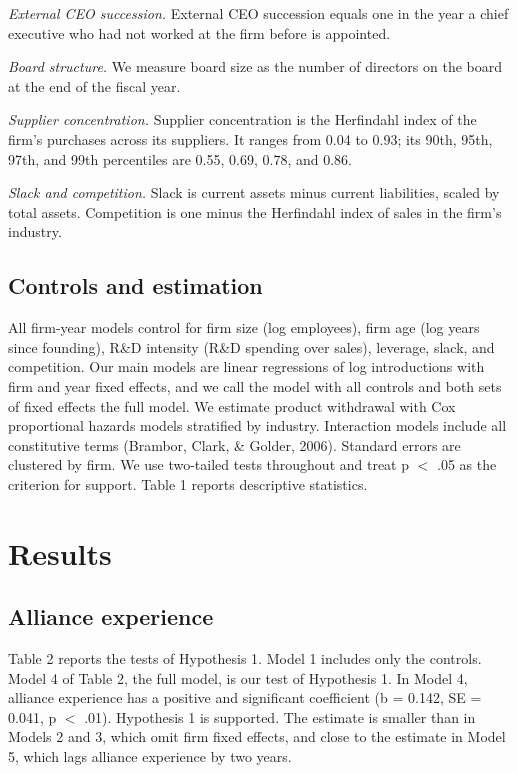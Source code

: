 \documentclass[12pt]{article}
\begin{document}
\textit{External CEO succession.} External CEO succession equals one in the year a chief executive who had not worked at the firm before is appointed.

\textit{Board structure.} We measure board size as the number of directors on the board at the end of the fiscal year.

\textit{Supplier concentration.} Supplier concentration is the Herfindahl index of the firm's purchases across its suppliers. It ranges from 0.04 to 0.93; its 90th, 95th, 97th, and 99th percentiles are 0.55, 0.69, 0.78, and 0.86.

\textit{Slack and competition.} Slack is current assets minus current liabilities, scaled by total assets. Competition is one minus the Herfindahl index of sales in the firm's industry.

\subsection{Controls and estimation}

All firm-year models control for firm size (log employees), firm age (log years since founding), R\&D intensity (R\&D spending over sales), leverage, slack, and competition. Our main models are linear regressions of log introductions with firm and year fixed effects, and we call the model with all controls and both sets of fixed effects the full model. We estimate product withdrawal with Cox proportional hazards models stratified by industry. Interaction models include all constitutive terms (Brambor, Clark, \& Golder, 2006). Standard errors are clustered by firm. We use two-tailed tests throughout and treat p $<$ .05 as the criterion for support. Table 1 reports descriptive statistics.

\section{Results}

\subsection{Alliance experience}

Table 2 reports the tests of Hypothesis 1. Model 1 includes only the controls. Model 4 of Table 2, the full model, is our test of Hypothesis 1. In Model 4, alliance experience has a positive and significant coefficient (b = 0.142, SE = 0.041, p $<$ .01). Hypothesis 1 is supported. The estimate is smaller than in Models 2 and 3, which omit firm fixed effects, and close to the estimate in Model 5, which lags alliance experience by two years.
\end{document}
